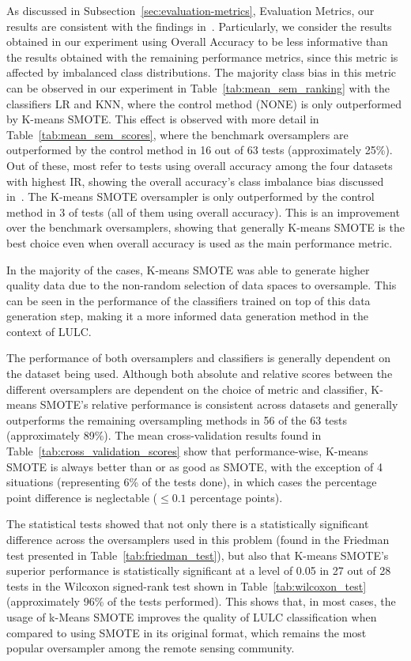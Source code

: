 \documentclass[preprint,12pt]{elsarticle}
\begin{document}
As discussed in Subsection~\ref{sec:evaluation-metrics}, Evaluation Metrics,
our results are consistent with the findings in~\cite{Olofsson2013,
Pontius2011}. Particularly, we consider the results obtained in our experiment
using Overall Accuracy to be less informative than the results obtained with
the remaining performance metrics, since this metric is affected by imbalanced
class distributions. The majority class bias in this metric can be observed
in our experiment in Table~\ref{tab:mean_sem_ranking} with the classifiers LR
and KNN, where the control method (NONE) is only outperformed by K-means
SMOTE. This effect is observed with more detail in
Table~\ref{tab:mean_sem_scores}, where the benchmark oversamplers are
outperformed by the control method in 16 out of 63 tests (approximately 25\%).
Out of these, most refer to tests using overall accuracy among the four
datasets with highest IR, showing the overall accuracy's class imbalance bias
discussed in~\cite{Olofsson2013, Pontius2011}. The K-means SMOTE oversampler
is only outperformed by the control method in 3 of tests (all of them using
overall accuracy). This is an improvement over the benchmark oversamplers,
showing that generally K-means SMOTE is the best choice even when overall
accuracy is used as the main performance metric.

In the majority of the cases, K-means SMOTE was able to generate higher
quality data due to the non-random selection of data spaces to oversample.
This can be seen in the performance of the classifiers trained on top of this
data generation step, making it a more informed data generation method in the
context of LULC\@.

The performance of both oversamplers and classifiers is generally dependent on
the dataset being used. Although both absolute and relative scores between the
different oversamplers are dependent on the choice of metric and classifier,
K-means SMOTE's relative performance is consistent across datasets and
generally outperforms the remaining oversampling methods in 56 of the 63 tests
(approximately 89\%). The mean cross-validation results found in
Table~\ref{tab:cross_validation_scores} show that performance-wise, K-means
SMOTE is always better than or as good as SMOTE, with the exception of 4
situations (representing 6\% of the tests done), in which cases the percentage
point difference is neglectable ($\leq 0.1$ percentage points). 

The statistical tests showed that not only there is a statistically
significant difference across the oversamplers used in this problem (found in
the Friedman test presented in Table~\ref{tab:friedman_test}), but also that
K-means SMOTE's superior performance is statistically significant at a level
of 0.05 in 27 out of 28 tests in the Wilcoxon signed-rank test shown in
Table~\ref{tab:wilcoxon_test} (approximately 96\% of the tests performed).
This shows that, in most cases, the usage of k-Means SMOTE improves the
quality of LULC classification when compared to using SMOTE in its original
format, which remains the most popular oversampler among the remote sensing
community.
\end{document}
